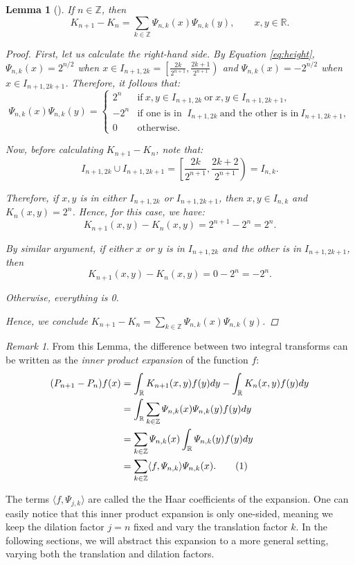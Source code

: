 \documentclass[11pt]{amsart}
\theoremstyle{theorem} %
\newtheorem{lem}[thm]{Lemma} %
\theoremstyle{definition}
\theoremstyle{example}
\theoremstyle{remark}
\newtheorem{rem}[thm]{Remark}
\numberwithin{equation}{section}
\newcommand{\R}{\mathbb{R}}
\newcommand{\Z}{\mathbb{Z}}
\newcommand\numberthis{\addtocounter{equation}{1}\tag{\theequation}}
\begin{document}
\begin{lem}[{\cite[293]{pinsky}}] \label{lem:expansion}
	If $ n \in \Z $, then
	\[ K_{n+1} - K_n = \sum_{k \in \Z} \varPsi_{n,k}(x) \varPsi_{n,k}(y),\qquad x,y \in \R. \]
	
	\begin{proof}
		First, let us calculate the right-hand side.
		By Equation \ref{eq:height}, $ \varPsi_{n,k}(x) = 2^{n/2} $ when $ x \in I_{n+1,2k} = \left[\frac{2k}{2^{n+1}}, \frac{2k+1}{2^{n+1}}\right) $ and $\varPsi_{n,k}(x)= -2^{n/2} $ when $ x \in I_{n+1,2k+1}$. Therefore, it follows that:
		\[
		\varPsi_{n,k}(x) \varPsi_{n,k} (y) =
		\begin{cases}
		2^n &\text{if}\ x,y \in I_{n+1,2k}\ \text{or}\ x,y \in I_{n+1,2k+1}, \\
		-2^n &\text{if one is in }\ I_{n+1,2k}\ \text{and the other is in}\ I_{n+1,2k+1}, \\
		0 &\text{otherwise}.
		\end{cases}
		\]
		
		Now, before calculating $ K_{n+1} - K_n $, note that:
		\[
		I_{n+1,2k} \cup I_{n+1,2k+1} = \left[ \frac{2k}{2^{n+1}}, \frac{2k+2}{2^{n+1}} \right) = I_{n,k}. 
		\]
		
		Therefore, if $ x,y $ is in either $ I_{n+1,2k} $ or $ I_{n+1,2k+1} $, then $ x,y \in I_{n,k} $ and $ K_n(x,y) = 2^n $. Hence, for this case, we have:
		\[ K_{n+1}(x,y) - K_n(x,y) = 2^{n+1} - 2^n = 2^n. \]
		
		By similar argument, if either $ x $ or $ y $ is in $  I_{n+1,2k} $ and the other is in $ I_{n+1,2k+1} $, then
		\[ K_{n+1}(x,y) - K_n(x,y) = 0 - 2^n = -2^n. \]
		
		Otherwise, everything is 0.
		
		Hence, we conclude $ K_{n+1} - K_n = \sum_{k \in \Z} \varPsi_{n,k}(x) \varPsi_{n,k}(y) $.
	\end{proof}
\end{lem}

\vspace{8pt}
\begin{rem}
	From this Lemma, the difference between two integral transforms can be written as the \textit{inner product expansion} of the function $ f $:
	\begin{align*}
	(P_{n+1} - P_n) f(x) &= \int_{\R} K_{n+1}(x,y)f(y)dy - \int_{\R} K_{n}(x,y)f(y)dy \\
	&= \int_{\R} \sum_{k \in \Z} \varPsi_{n,k}(x) \varPsi_{n,k}(y) f(y) dy \\
	&= \sum_{k \in \Z} \varPsi_{n,k}(x) \int_{\R} \varPsi_{n,k}(y) f(y) dy \\
	&= \sum_{k \in \Z} \langle f, \varPsi_{n,k} \rangle \varPsi_{n,k}(x).  \numberthis \label{eq:expansion}
	\end{align*}
	
	The terms $ \langle f, \varPsi_{j,k} \rangle $ are called the the Haar coefficients of the expansion.
	One can easily notice that this inner product expansion is only one-sided, meaning we keep the dilation factor $ j = n $ fixed and vary the translation factor $ k $. In the following sections, we will abstract this expansion to a more general setting, varying both the translation and dilation factors.
\end{rem}
\end{document}
